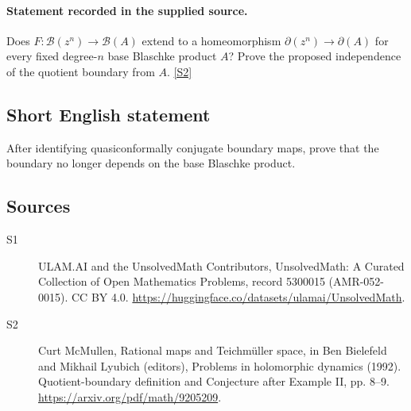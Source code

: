 \documentclass[11pt]{article}
\newcommand{\sref}[2]{\hyperlink{source:#1:#2}{[S#2]}}
\begin{document}
\paragraph{Statement recorded in the supplied source.}
Does $F:\mathcal B(z^n)\to\mathcal B(A)$ extend to a homeomorphism $\partial(z^n)\to\partial(A)$ for every fixed degree-$n$ base Blaschke product $A$? Prove the proposed independence of the quotient boundary from $A$. \sref{5300015}{2}
\subsection{Short English statement}
After identifying quasiconformally conjugate boundary maps, prove that the boundary no longer depends on the base Blaschke product.
\subsection{Sources}
\begin{description}
\item[\hypertarget{source:5300015:1}{S1}] ULAM.AI and the UnsolvedMath Contributors, UnsolvedMath: A Curated Collection of Open Mathematics Problems, record 5300015 (AMR-052-0015). CC BY 4.0. \url{https://huggingface.co/datasets/ulamai/UnsolvedMath}.
\item[\hypertarget{source:5300015:2}{S2}] Curt McMullen, Rational maps and Teichmüller space, in Ben Bielefeld and Mikhail Lyubich (editors), Problems in holomorphic dynamics (1992). Quotient-boundary definition and Conjecture after Example II, pp. 8–9. \url{https://arxiv.org/pdf/math/9205209}.
\end{description}
\label{end:5300015}
\end{document}
